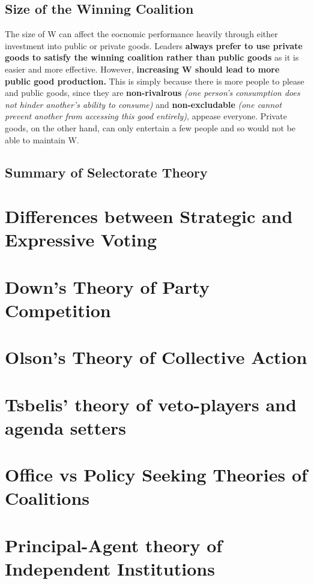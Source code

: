 \documentclass[12pt, letterpaper]{article}
\begin{document}
\subsection{Size of the Winning Coalition}
The size of W can affect the eocnomic performance heavily through either investment into public or private goods. Leaders \textbf{always prefer to use private goods to satisfy the winning coalition rather than public goods} as it is easier and more effective. However, \textbf{increasing W should lead to more public good production.} This is simply because there is more people to please and public goods, since they are \textbf{non-rivalrous} \textit{(one person's consumption does not hinder another's ability to consume)} and \textbf{non-excludable} \textit{(one cannot prevent another from accessing this good entirely)}, appease everyone. Private goods, on the other hand, can only entertain a few people and so would not be able to maintain W.

\subsection{Summary of Selectorate Theory}

\newpage
\section{Differences between Strategic and Expressive Voting}


\newpage
\section{Down's Theory of Party Competition}


\newpage
\section{Olson's Theory of Collective Action}


\newpage
\section{Tsbelis' theory of veto-players and agenda setters}


\newpage
\section{Office vs Policy Seeking Theories of Coalitions}


\newpage
\section{Principal-Agent theory of Independent Institutions}
\end{document}
